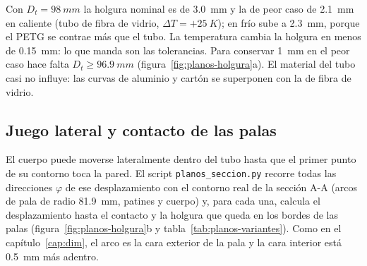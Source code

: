 Con $D_t=\SI{98}{mm}$ la holgura nominal es de \SI{3.0}{mm} y la de peor caso de
\SI{2.1}{mm} en caliente (tubo de fibra de vidrio, $\Delta T=+\SI{25}{K}$); en frío sube
a \SI{2.3}{mm}, porque el PETG se contrae más que el tubo. La temperatura cambia la
holgura en menos de \SI{0.15}{mm}: lo que manda son las tolerancias. Para conservar
\SI{1}{mm} en el peor caso hace falta $D_t\ge\SI{96.9}{mm}$
(figura~\ref{fig:planos-holgura}a). El material del tubo casi no influye: las curvas de
aluminio y cartón se superponen con la de fibra de vidrio.

\subsection{Juego lateral y contacto de las palas}

El cuerpo puede moverse lateralmente dentro del tubo hasta que el primer punto de su
contorno toca la pared. El script \texttt{planos\_seccion.py} recorre todas las
direcciones $\varphi$ de ese desplazamiento con el contorno real de la sección A-A
(arcos de pala de radio \SI{81.9}{mm}, patines y cuerpo) y, para cada una, calcula el
desplazamiento hasta el contacto y la holgura que queda en los bordes de las palas
(figura~\ref{fig:planos-holgura}b y tabla~\ref{tab:planos-variantes}). Como en el
capítulo~\ref{cap:dim}, el arco es la cara exterior de la pala y la cara interior está
\SI{0.5}{mm} más adentro.

